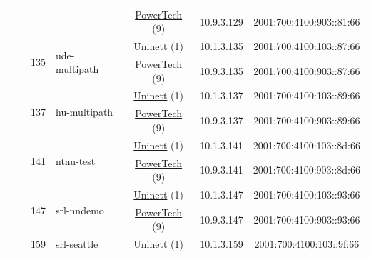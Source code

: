 \begin{small}
\begin{center}
\begin{longtable}{|c|c|c|c|c|c|c|c|}
  &  &  &  & \multicolumn{2}{|c|}{\tiny{\href{http://www.powertech.no}{PowerTech} (9)}} & \tiny{10.9.3.129} & \tiny{2001:700:4100:903::81:66} \\* \cline{3-3}\cline{4-4}\cline{5-5}\cline{6-6}\cline{7-7}\cline{8-8}
  &  & \multirow{2}{*}{\tiny{135}} & \multicolumn{1}{|l|}{\multirow{2}{*}{\tiny{ude-multipath}}} & \multicolumn{2}{|c|}{\tiny{\href{https://www.uninett.no}{Uninett} (1)}} & \tiny{10.1.3.135} & \tiny{2001:700:4100:103::87:66} \\* \cline{5-5}\cline{6-6}\cline{7-7}\cline{8-8}
  &  &  &  & \multicolumn{2}{|c|}{\tiny{\href{http://www.powertech.no}{PowerTech} (9)}} & \tiny{10.9.3.135} & \tiny{2001:700:4100:903::87:66} \\* \cline{3-3}\cline{4-4}\cline{5-5}\cline{6-6}\cline{7-7}\cline{8-8}
  &  & \multirow{2}{*}{\tiny{137}} & \multicolumn{1}{|l|}{\multirow{2}{*}{\tiny{hu-multipath}}} & \multicolumn{2}{|c|}{\tiny{\href{https://www.uninett.no}{Uninett} (1)}} & \tiny{10.1.3.137} & \tiny{2001:700:4100:103::89:66} \\* \cline{5-5}\cline{6-6}\cline{7-7}\cline{8-8}
  &  &  &  & \multicolumn{2}{|c|}{\tiny{\href{http://www.powertech.no}{PowerTech} (9)}} & \tiny{10.9.3.137} & \tiny{2001:700:4100:903::89:66} \\* \cline{3-3}\cline{4-4}\cline{5-5}\cline{6-6}\cline{7-7}\cline{8-8}
  &  & \multirow{2}{*}{\tiny{141}} & \multicolumn{1}{|l|}{\multirow{2}{*}{\tiny{ntnu-test}}} & \multicolumn{2}{|c|}{\tiny{\href{https://www.uninett.no}{Uninett} (1)}} & \tiny{10.1.3.141} & \tiny{2001:700:4100:103::8d:66} \\* \cline{5-5}\cline{6-6}\cline{7-7}\cline{8-8}
  &  &  &  & \multicolumn{2}{|c|}{\tiny{\href{http://www.powertech.no}{PowerTech} (9)}} & \tiny{10.9.3.141} & \tiny{2001:700:4100:903::8d:66} \\* \cline{3-3}\cline{4-4}\cline{5-5}\cline{6-6}\cline{7-7}\cline{8-8}
  &  & \multirow{2}{*}{\tiny{147}} & \multicolumn{1}{|l|}{\multirow{2}{*}{\tiny{srl-nndemo}}} & \multicolumn{2}{|c|}{\tiny{\href{https://www.uninett.no}{Uninett} (1)}} & \tiny{10.1.3.147} & \tiny{2001:700:4100:103::93:66} \\* \cline{5-5}\cline{6-6}\cline{7-7}\cline{8-8}
  &  &  &  & \multicolumn{2}{|c|}{\tiny{\href{http://www.powertech.no}{PowerTech} (9)}} & \tiny{10.9.3.147} & \tiny{2001:700:4100:903::93:66} \\* \cline{3-3}\cline{4-4}\cline{5-5}\cline{6-6}\cline{7-7}\cline{8-8}
  &  & \multirow{2}{*}{\tiny{159}} & \multicolumn{1}{|l|}{\multirow{2}{*}{\tiny{srl-seattle}}} & \multicolumn{2}{|c|}{\tiny{\href{https://www.uninett.no}{Uninett} (1)}} & \tiny{10.1.3.159} & \tiny{2001:700:4100:103::9f:66} \\* \cline{5-5}\cline{6-6}\cline{7-7}\cline{8-8}

\end{longtable}
\end{center}
\end{small}

